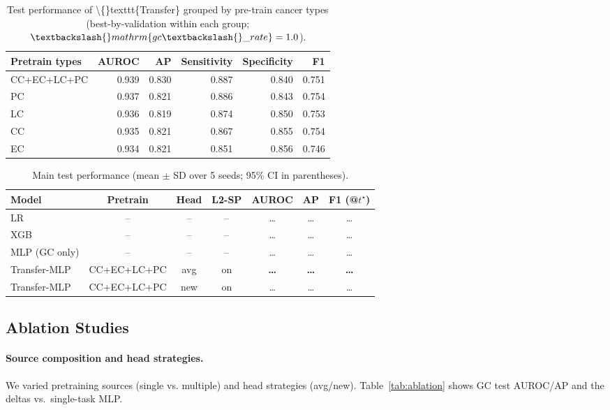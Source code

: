 \documentclass[diagnostics,article,submit,pdftex,moreauthors]{Definitions/mdpi}
\begin{document}
\begin{table}[t]
\centering
\small
\begin{tabular}{lrrrrr}
\toprule
Pretrain types & AUROC & AP & Sensitivity & Specificity & F1 \\
\midrule
CC+EC+LC+PC & 0.939 & 0.830 & 0.887 & 0.840 & 0.751 \\
PC & 0.937 & 0.821 & 0.886 & 0.843 & 0.754 \\
LC & 0.936 & 0.819 & 0.874 & 0.850 & 0.753 \\
CC & 0.935 & 0.821 & 0.867 & 0.855 & 0.754 \\
EC & 0.934 & 0.821 & 0.851 & 0.856 & 0.746 \\
\bottomrule
\end{tabular}

\caption{Test performance of \textbackslash\{\}texttt\{Transfer\} grouped by pre-train cancer types (best-by-validation within each group; $\textbackslash\{\}mathrm\{gc\textbackslash\{\}\_rate\}=1.0$).}
\label{tab:transfer-by-pretrain-types}
\end{table}




\begin{table}[H]
\caption{Main test performance (mean $\pm$ SD over 5 seeds; 95\% CI in parentheses).}
\label{tab:main}
\centering
\begin{tabular}{lcccccc}
\toprule
Model & Pretrain & Head & L2-SP & AUROC & AP & F1 (@$t^\star$) \\
\midrule
LR & -- & -- & -- & \dots & \dots & \dots \\
XGB & -- & -- & -- & \dots & \dots & \dots \\
MLP (GC only) & -- & -- & -- & \dots & \dots & \dots \\
Transfer-MLP & CC+EC+LC+PC & avg & on & \textbf{\dots} & \textbf{\dots} & \textbf{\dots} \\
Transfer-MLP & CC+EC+LC+PC & new & on & \dots & \dots & \dots \\
\bottomrule
\end{tabular}
\end{table}

\subsection{Ablation Studies}
\paragraph{Source composition and head strategies.}
We varied pretraining sources (single vs. multiple) and head strategies (avg/new).
Table~\ref{tab:ablation} shows GC test AUROC/AP and the deltas vs.\ single-task MLP.
\end{document}
